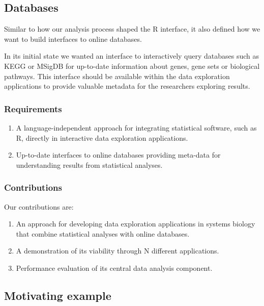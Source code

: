 \subsection*{Databases} 
Similar to how our analysis process shaped the R interface, it also defined how
we want to build interfaces to online databases. 

In its initial state we wanted an interface to interactively query databases
such as KEGG or MSigDB for up-to-date information about genes, gene sets or
biological pathways. This interface should be available within the data
exploration applications to provide valuable metadata for the researchers
exploring results.  

\subsubsection*{Requirements} 
\begin{enumerate}
    \item A language-independent approach for integrating statistical software,
    such as R, directly in interactive data exploration applications.
    \item Up-to-date interfaces to online databases providing meta-data for
    understanding results from statistical analyses. 
\end{enumerate} 

\subsubsection*{Contributions} 
Our contributions are: 
\begin{enumerate}
\item An approach for developing data exploration applications in systems
biology that combine statistical analyses with online databases.  
\item A demonstration of its viability through N different applications. 
\item Performance evaluation of its central data analysis component. 
\end{enumerate} 



\subsection*{Motivating example}



